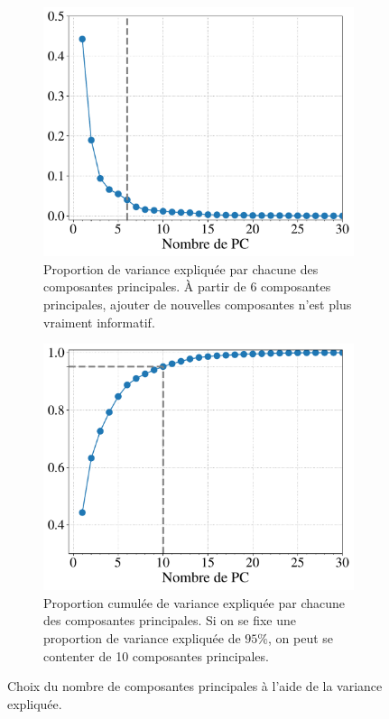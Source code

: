 \begin{figure}[h]
  \begin{subfigure}[t]{0.43\textwidth}
    \centering
    \includegraphics[width=\textwidth]{figures/dimred/scree_plot}
    \caption{Proportion de variance expliquée par chacune des composantes
      principales. À partir de 6 composantes principales, ajouter de nouvelles
      composantes n'est plus vraiment informatif.}
    \label{fig:scree_plot}
  \end{subfigure} \hfill
  \begin{subfigure}[t]{0.43\textwidth}
    \includegraphics[width=\textwidth]{figures/dimred/scree_plot_cumul}  
    \caption{Proportion cumulée de variance expliquée par chacune des
      composantes principales. Si on se fixe une proportion de variance
      expliquée de $95\%$, on peut se contenter de 10 composantes principales.}
    \label{fig:scree_plot_cumul}
  \end{subfigure}
  \caption{Choix du nombre de composantes principales à l'aide de la variance expliquée.}
  \label{fig:scree_plots}
\end{figure}

